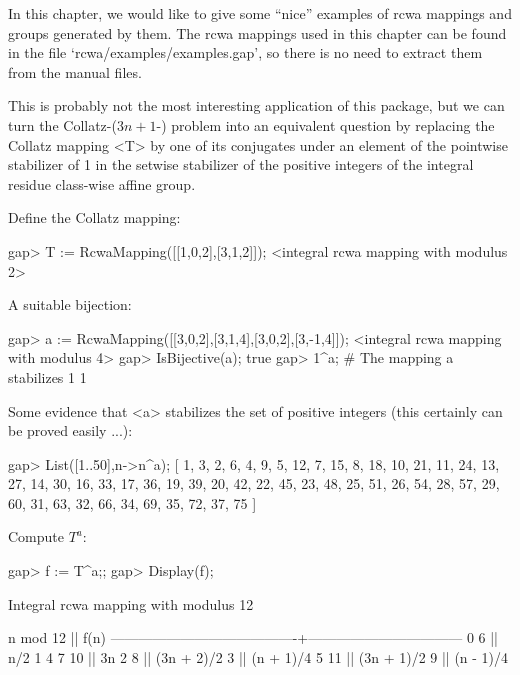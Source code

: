 

In this chapter, we would like to give some ``nice'' examples of rcwa
mappings and groups generated by them.
The rcwa mappings used in this chapter can be found in the file
`rcwa/examples/examples.gap', so there is no need to extract them from
the manual files.


This is probably not the most interesting application of this package,
but we can turn the Collatz-($3n+1$-) problem into an equivalent question
by replacing the Collatz mapping <T> by one of its conjugates under an
element of the pointwise stabilizer of 1 in the setwise stabilizer of
the positive integers of the integral residue class-wise affine group.

Define the Collatz mapping:

\beginexample
gap> T := RcwaMapping([[1,0,2],[3,1,2]]);
<integral rcwa mapping with modulus 2>
\endexample

A suitable bijection:

\beginexample
gap> a := RcwaMapping([[3,0,2],[3,1,4],[3,0,2],[3,-1,4]]);
<integral rcwa mapping with modulus 4>
gap> IsBijective(a);
true
gap> 1^a; # The mapping a stabilizes 1
1
\endexample

Some evidence that <a> stabilizes the set of positive integers (this
certainly can be proved easily ...):

\beginexample
gap> List([1..50],n->n^a);
[ 1, 3, 2, 6, 4, 9, 5, 12, 7, 15, 8, 18, 10, 21, 11, 24, 13, 27, 14, 30, 16, 
  33, 17, 36, 19, 39, 20, 42, 22, 45, 23, 48, 25, 51, 26, 54, 28, 57, 29, 60, 
  31, 63, 32, 66, 34, 69, 35, 72, 37, 75 ]
\endexample

Compute $T^a$:

\beginexample
gap> f := T^a;;
gap> Display(f);

Integral rcwa mapping with modulus 12

               n mod 12                 ||              f(n)              
----------------------------------------+---------------------------------
   0  6                                 || n/2
   1  4  7 10                           || 3n
   2  8                                 || (3n + 2)/2
   3                                    || (n + 1)/4
   5 11                                 || (3n + 1)/2
   9                                    || (n - 1)/4

